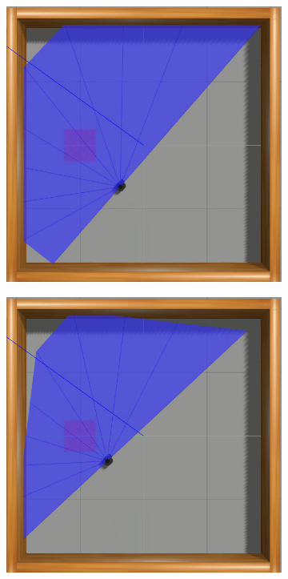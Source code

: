 \begin{figure}[htbp]
\begin{subfigure}[b]{0.115\textwidth}
    \end{subfigure}
    \newline
    \begin{subfigure}[b]{0.115\textwidth}
        \includegraphics[width=\textwidth]{images/simenv1/5.png}
    \end{subfigure}
    \hfill
    \begin{subfigure}[b]{0.115\textwidth}
        \includegraphics[width=\textwidth]{images/simenv1/6.png}

\end{subfigure}
\end{figure}
